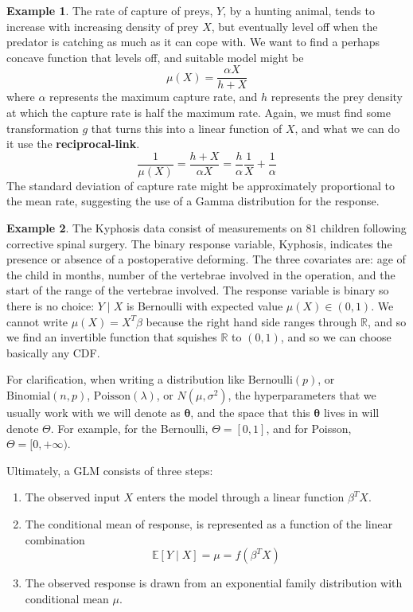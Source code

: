 \documentclass{article}
\theoremstyle{definition}
\newtheorem{example}{Example}[section]
\begin{document}
  \begin{example}
  The rate of capture of preys, $Y$, by a hunting animal, tends to increase with increasing density of prey $X$, but eventually level off when the predator is catching as much as it can cope with. We want to find a perhaps concave function that levels off, and suitable model might be 
  \[\mu(X) = \frac{\alpha X}{h + X}\]
  where $\alpha$ represents the maximum capture rate, and $h$ represents the prey density at which the capture rate is half the maximum rate. Again, we must find some transformation $g$ that turns this into a linear function of $X$, and what we can do it use the \textbf{reciprocal-link}. 
  \[\frac{1}{\mu(X)} = \frac{h + X}{\alpha X} = \frac{h}{\alpha} \frac{1}{X} + \frac{1}{\alpha}\]
  The standard deviation of capture rate might be approximately proportional to the mean rate, suggesting the use of a Gamma distribution for the response. 
  \end{example}

  \begin{example}
  The Kyphosis data consist of measurements on $81$ children following corrective spinal surgery. The binary response variable, Kyphosis, indicates the presence or absence of a postoperative deforming. The three covariates are: age of the child in months, number of the vertebrae involved in the operation, and the start of the range of the vertebrae involved. The response variable is binary so there is no choice: $Y \mid X$ is Bernoulli with expected value $\mu(X) \in (0, 1)$. We cannot write $\mu(X) = X^T \beta$ because the right hand side ranges through $\mathbb{R}$, and so we find an invertible function that squishes $\mathbb{R}$ to $(0, 1)$, and so we can choose basically any CDF. 
  \end{example}

  For clarification, when writing a distribution like $\mathrm{Bernoulli}(p)$, or $\mathrm{Binomial}(n, p)$, $\mathrm{Poisson}(\lambda)$, or $N(\mu, \sigma^2)$, the hyperparameters that we usually work with we will denote as $\boldsymbol{\theta}$, and the space that this $\boldsymbol{\theta}$ lives in will denote $\Theta$. For example, for the Bernoulli, $\Theta = [0, 1]$, and for Poisson, $\Theta = [0, +\infty)$. 

  Ultimately, a GLM consists of three steps: 
  \begin{enumerate}
      \item The observed input $X$ enters the model through a linear function $\beta^T X$. 
      \item The conditional mean of response, is represented as a function of the linear combination 
      \[\mathbb{E}[Y \mid X] = \mu = f(\beta^T X)\]
      \item The observed response is drawn from an exponential family distribution with conditional mean $\mu$. 
  \end{enumerate}
\end{document}
